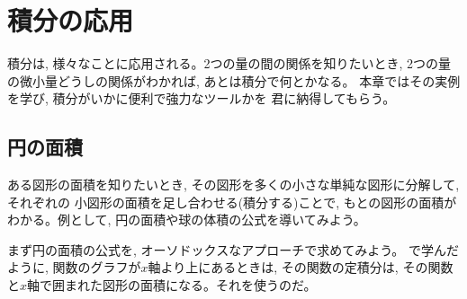 \chapter{積分の応用}\label{chapt:integ_app}

積分は, 様々なことに応用される。2つの量の間の関係を知りたいとき, 
2つの量の微小量どうしの関係がわかれば, あとは積分で何とかなる。
本章ではその実例を学び, 積分がいかに便利で強力なツールかを
君に納得してもらう。

\section{円の面積}

ある図形の面積を知りたいとき, その図形を多くの小さな単純な図形に分解して, それぞれの
小図形の面積を足し合わせる(積分する)ことで, もとの図形の面積がわかる。例として, 
円の面積や球の体積の公式を導いてみよう。\mv

まず円の面積の公式を, 
オーソドックスなアプローチで求めてみよう。
で学んだように, 関数のグラフが$x$軸より上にあるときは, 
その関数の定積分は, その関数と$x$軸で囲まれた図形の面積になる。それを使うのだ。

